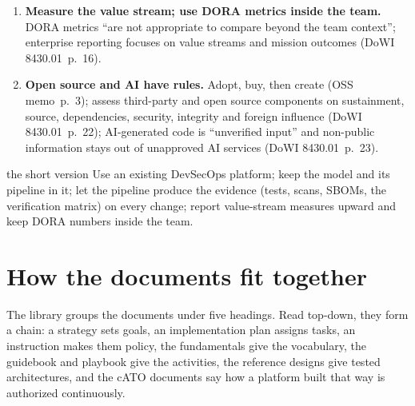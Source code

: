 \documentclass[11pt,letterpaper,twoside,openany]{memoir}
\newcommand{\pg}[2]{{\small(#1~p.~#2)}}          %
\begin{document}
{\begin{enumerate}[leftmargin=1.6em,itemsep=2pt]
\item \textbf{Measure the value stream; use DORA metrics inside the team.} DORA metrics ``are not appropriate to compare
  beyond the team context''; enterprise reporting focuses on value streams and mission outcomes \pg{DoWI 8430.01}{16}.
\item \textbf{Open source and AI have rules.} Adopt, buy, then create \pg{OSS memo}{3}; assess third-party and open
  source components on sustainment, source, dependencies, security, integrity and foreign influence \pg{DoWI 8430.01}{22};
  AI-generated code is ``unverified input'' and non-public information stays out of unapproved AI services
  \pg{DoWI 8430.01}{23}.
\end{enumerate}
}

\begin{boxteam}{the short version}
{\small Use an existing DevSecOps platform; keep the model and its pipeline in it; let the pipeline produce the
evidence (tests, scans, SBOMs, the verification matrix) on every change; report value-stream measures upward and keep
DORA numbers inside the team.}
\end{boxteam}

\chapter{How the documents fit together}\label{ch:map}

The library groups the documents under five headings. Read top-down, they form a chain: a strategy sets goals, an
implementation plan assigns tasks, an instruction makes them policy, the fundamentals give the vocabulary, the
guidebook and playbook give the activities, the reference designs give tested architectures, and the cATO documents
say how a platform built that way is authorized continuously.
\end{document}
